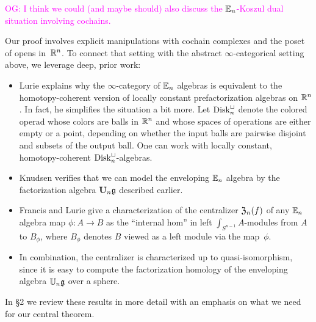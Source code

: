 \documentclass[11pt]{amsart}
\numberwithin{equation}{section}
\def\owen{\textcolor{magenta}{OG: }\textcolor{magenta}}
\begin{document}
\owen{I think we could (and maybe should) also discuss the $\mathbb E_n$-Koszul dual situation involving cochains.}

\def\Disk{{\rm Disk}}

Our proof involves explicit manipulations with cochain complexes and the poset of opens in~$\mathbb R^n$.
To connect that setting with the abstract $\infty$-categorical setting above,
we leverage deep, prior work:
\begin{itemize}
\item Lurie \cite{LurieHA} explains why the $\infty$-category of $\mathbb E_n$ algebras is equivalent to the homotopy-coherent version of locally constant prefactorization algebras on $\mathbb R^n$.  
In fact, he simplifies the situation a bit more. 
Let $\Disk_n^\sqcup$ denote the colored operad whose colors are balls in $\mathbb R^n$ and whose spaces of operations are either empty or a point, depending on whether the input balls are pairwise disjoint and subsets of the output ball. 
One can work with locally constant, homotopy-coherent $\Disk_n^\sqcup$-algebras.
\item Knudsen verifies that we can model the enveloping $\mathbb E_n$ algebra by the factorization algebra $\mathbf U_n \mathfrak g$ described earlier.
\item Francis and Lurie give a characterization of the centralizer ${\frak Z}_n(f)$ of any $\mathbb E_n$ algebra map $\phi: A \to B$ as the ``internal hom'' in left $\int_{S^{n-1}}A$-modules from $A$ to $B_\phi$, where $B_\phi$ denotes $B$ viewed as a left module via the map~$\phi$.
\item In combination, the centralizer is characterized up to quasi-isomorphism, 
since it is easy to compute the factorization homology of the enveloping algebra $\mathbb U_n \mathfrak g$ over a sphere.
\end{itemize}
In \S2 we review these results in more detail with an emphasis on what we need for our central theorem.
\end{document}
